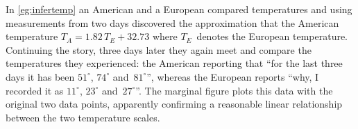\begin{example} \label{eg:infertemp2}
In \cref{eg:infertemp} an American and a European compared temperatures and using measurements from two days discovered the approximation that the American temperature \(T_A=1.82\,T_E+32.73\) where \(T_E\)~denotes the European temperature.
Continuing the story, three days later they again meet and compare the temperatures they experienced: the American reporting that ``for the last three days it has been \(51^\circ\), \(74^\circ\) and~\(81^\circ\)'', whereas the European reports ``why, I recorded it as \(11^\circ\), \(23^\circ\) and~\(27^\circ\)''.
The marginal figure plots this data with the original two data points, apparently confirming a reasonable linear relationship between the two temperature scales.


\end{example}
